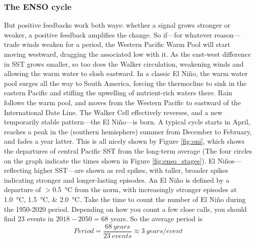 \documentclass[amstex,12pt]{book}
\begin{document}
{\subsubsection{The ENSO cycle} \label{enso_cycle}
But positive feedbacks work both ways: whether a signal grows stronger or weaker, a positive feedback amplifies the change. So if---for whatever reason---trade winds weaken for a period, the Western Pacific Warm Pool will start moving westward, dragging the associated low with it. As the east-west difference in SST grows smaller, so too does the Walker circulation, weakening winds and allowing the warm water to slosh eastward. In a classic El Ni\~no, the warm water pool surges all the way to South America, forcing the thermocline to sink in the eastern Pacific and stifling the upwelling of nutrient-rich waters there. Rain follows the warm pool, and moves from the Western Pacific to eastward of the International Date Line. The Walker Cell effectively reverses, and a new temporarily stable pattern---the El Ni\~no---is born. A typical cycle starts in April, reaches a peak in the (southern hemisphere) summer from December to February, and fades a year latter. This is all nicely shown by Figure \ref{fig:oni}, which shows the departures of central Pacific SST from the long-term average (The four circles on the graph indicate the times shown in Figure \ref{fig:enso_stages}). El Ni\~nos---reflecting higher SST---are shown as red spikes, with taller, broader spikes indicating stronger and longer-lasting episodes. An El Ni\~no is defined by a departure of $>$\SI{0.5}{\celsius} from the norm, with increasingly stronger episodes at \SIlist{1.0; 1.5; 2.0}{\celsius}. Take the time to count the number of El Ni\~no during the 1950-2020 period. Depending on how you count a few close calls, you should find 23 events in $2018-2050=68$ years. So the average period is
\begin{equation}
	Period=\frac{68\ years}{23\ events}\approx 3\ years/event
\end{equation}
}
\end{document}
